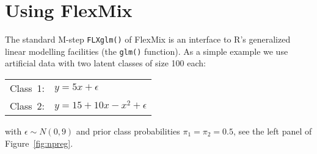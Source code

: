 \documentclass{jss}
\begin{document}
\section{Using FlexMix}
\label{sec:using-flexmix}




The standard M-step \texttt{FLXglm()} of FlexMix is an interface to
R's generalized linear modelling facilities (the \texttt{glm()}
function).  As a simple example we use artificial data with two latent
classes of size 100 each:
\begin{center}
  \begin{tabular}{ll}
    Class~1: & $ y = 5x+\epsilon$\\
    Class~2: & $ y = 15+10x-x^2+\epsilon$\\
  \end{tabular}
\end{center}
with $\epsilon\sim N(0,9)$ and prior class probabilities
$\pi_1=\pi_2=0.5$, see the left panel of Figure~\ref{fig:npreg}. 
\end{document}
